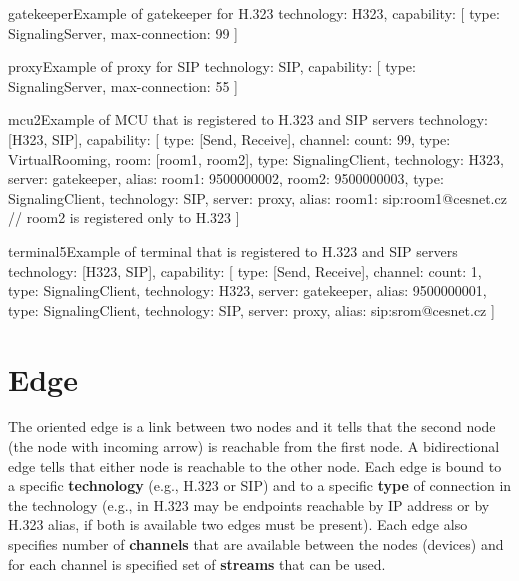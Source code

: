 \documentclass[a4paper]{report}
\begin{document}
\begin{itemize}
\begin{TopologyExample}{gatekeeper}{Example of gatekeeper for H.323}
technology: H323,
capability: [
  {type: SignalingServer, max-connection: 99}
]
\end{TopologyExample}

\begin{TopologyExample}{proxy}{Example of proxy for SIP}
technology: SIP,
capability: [
  {type: SignalingServer, max-connection: 55}
]
\end{TopologyExample}

\begin{TopologyExample}{mcu2}{Example of MCU that is registered to H.323 and SIP servers}
technology: [H323, SIP],
capability: [
  {type: [Send, Receive], channel: {count: 99}},
  {type: VirtualRooming, room: [room1, room2]},
  {type: SignalingClient, technology: H323, server: gatekeeper,
     alias: {room1: 9500000002, room2: 9500000003}},
  {type: SignalingClient, technology: SIP, server: proxy,
     alias: {room1: sip:room1@cesnet.cz}} // room2 is registered only to H.323
]
\end{TopologyExample}

\begin{TopologyExample}{terminal5}{Example of terminal that is registered to H.323 and SIP servers}
technology: [H323, SIP],
capability: [
  {type: [Send, Receive], channel: {count: 1}},
  {type: SignalingClient, technology: H323, server: gatekeeper,
     alias: 9500000001},
  {type: SignalingClient, technology: SIP, server: proxy,
     alias: sip:srom@cesnet.cz}
]
\end{TopologyExample}

\end{itemize}
 

\section{Edge}

The oriented edge is a link between two nodes and it tells that the second node (the node with incoming arrow) is reachable from the first node. A bidirectional edge tells that either node is reachable to the other node. Each edge is bound to a specific \textbf{technology} (e.g., H.323 or SIP) and to a specific \textbf{type} of connection in the technology (e.g., in H.323 may be endpoints reachable by IP address or by H.323 alias, if both is available two edges must be present). Each edge also specifies number of \textbf{channels} that are available between the nodes (devices) and for each channel is specified set of \textbf{streams} that can be used.
\end{document}
